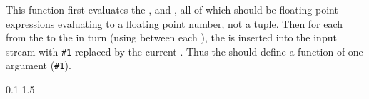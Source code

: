 \documentclass[oneside]{book}
\begin{document}

\begin{function}{\FpStepInline}
\begin{syntax}
    
\end{syntax}
This function first evaluates the , 
and , all of which should be floating point
expressions evaluating to a floating point number, not a tuple.
Then for each  from the  to the
 in turn (using  between each
), the  is inserted into the input stream
with \verb|#1| replaced by the current . Thus the
 should define a function of one argument (\verb|#1|).
\begin{demohigh}
\IgnoreSpacesOn
\TlClear \lTmpaTl
{} {0.1} {1.5} {
  \TlPutRight \lTmpaTl {[#1]}
}
\TlUse \lTmpaTl
\IgnoreSpacesOff
\end{demohigh}
\end{function}
\end{document}

